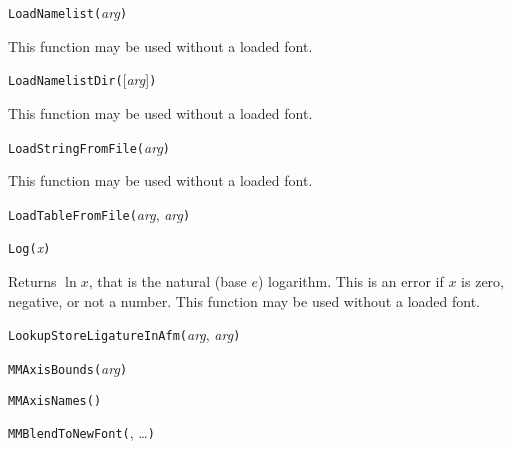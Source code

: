 

\texttt{LoadNamelist(}\textit{arg}\texttt{)}

This function may be used without a loaded font.



\texttt{LoadNamelistDir(}[\textit{arg}]\texttt{)}

This function may be used without a loaded font.



\texttt{LoadStringFromFile(}\textit{arg}\texttt{)}

This function may be used without a loaded font.



\texttt{LoadTableFromFile(}\textit{arg}, \textit{arg}\texttt{)}



\texttt{Log(}\textit{x}\texttt{)}

Returns $\ln x$, that is the natural (base $e$) logarithm.  This is an error
if $x$ is zero, negative, or not a number.
This function may be used without a loaded font.



\texttt{LookupStoreLigatureInAfm(}\textit{arg}, \textit{arg}\texttt{)}



\texttt{MMAxisBounds(}\textit{arg}\texttt{)}



\texttt{MMAxisNames(}\texttt{)}



\texttt{MMBlendToNewFont(}, \ldots\texttt{)}

